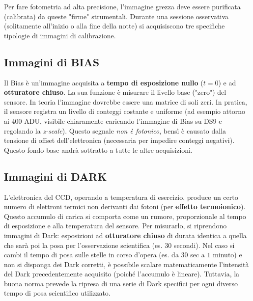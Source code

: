 Per fare fotometria ad alta precisione, l'immagine grezza deve essere purificata (calibrata) da queste "firme" strumentali. Durante una sessione osservativa (solitamente all'inizio o alla fine della notte) si acquisiscono tre specifiche tipologie di immagini di calibrazione.

\subsection{Immagini di BIAS}
Il Bias è un'immagine acquisita a \textbf{tempo di esposizione nullo} ($t = 0$) e ad \textbf{otturatore chiuso}. La sua funzione è misurare il livello base ("zero") del sensore.
In teoria l'immagine dovrebbe essere una matrice di soli zeri. In pratica, il sensore registra un livello di conteggi costante e uniforme (ad esempio attorno ai $400$ ADU, visibile chiaramente caricando l'immagine di Bias su DS9 e regolando la \textit{z-scale}). Questo segnale \textit{non è fotonico}, bensì è causato dalla tensione di offset dell'elettronica (necessaria per impedire conteggi negativi). Questo fondo base andrà sottratto a tutte le altre acquisizioni.

\subsection{Immagini di DARK}
L'elettronica del CCD, operando a temperatura di esercizio, produce un certo numero di elettroni termici non derivanti dai fotoni (per \textbf{effetto termoionico}). Questo accumulo di carica si comporta come un rumore, proporzionale al tempo di esposizione e alla temperatura del sensore.
Per misurarlo, si riprendono immagini di Dark: esposizioni ad \textbf{otturatore chiuso} di durata identica a quella che sarà poi la posa per l'osservazione scientifica (es. $30$ secondi).
Nel caso si cambi il tempo di posa sulle stelle in corso d'opera (es. da $30$ sec a $1$ minuto) e non si disponga dei Dark corretti, è possibile scalare matematicamente l'intensità del Dark precedentemente acquisito (poiché l'accumulo è lineare). Tuttavia, la buona norma prevede la ripresa di una serie di Dark specifici per ogni diverso tempo di posa scientifico utilizzato.

